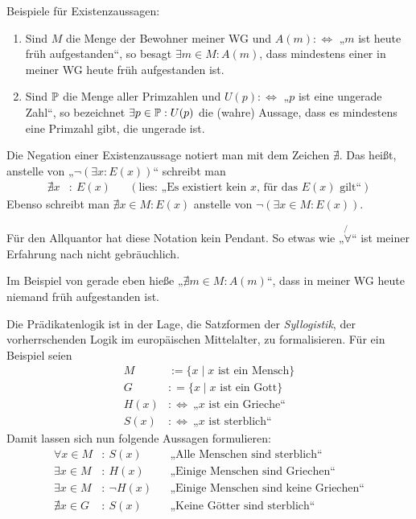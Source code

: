 \begin{bsp}
    Beispiele für Existenzaussagen:
    \begin{enumerate}
        \item Sind $M$ die Menge der Bewohner meiner WG und $A(m):\Leftrightarrow$ „$m$ ist heute früh aufgestanden“, so besagt $\exists m\in M: A(m)$, dass mindestens einer in meiner WG heute früh aufgestanden ist.
        \item Sind $\mathbb P$ die Menge aller Primzahlen und $U(p):\Leftrightarrow$ „$p$ ist eine ungerade Zahl“, so bezeichnet $\exists p\in \mathbb P: U(p)$ die (wahre) Aussage, dass es mindestens eine Primzahl gibt, die ungerade ist.
    \end{enumerate}
\end{bsp}


\begin{nota}
    Die Negation einer Existenzaussage notiert man mit dem Zeichen $\nexists$. Das heißt, anstelle von „$\neg (\exists x: E(x))$“ schreibt man
    \begin{align*}
        \nexists x &:\ E(x) && (\text{lies: „Es existiert kein $x$, für das $E(x)$ gilt“})
    \end{align*}
    Ebenso schreibt man $\nexists x\in M: E(x)$ anstelle von $\neg (\exists x\in M: E(x))$.
    
    Für den Allquantor hat diese Notation kein Pendant. So etwas wie „$\not{\!\forall}$“ ist meiner Erfahrung nach nicht gebräuchlich.
\end{nota}


\begin{bsp}
    Im Beispiel von gerade eben hieße „$\nexists m\in M: A(m)$“, dass in meiner WG heute niemand früh aufgestanden ist.
\end{bsp}


\begin{bsp}[Syllogistik]
    Die Prädikatenlogik ist in der Lage, die Satzformen der \emph{Syllogistik}, der vorherrschenden Logik im europäischen Mittelalter, zu formalisieren. Für ein Beispiel seien
    \begin{align*}
        M & := \{ x\mid  \text{$x$ ist ein Mensch} \} \\
        G &  : = \{x\mid \text{$x$ ist ein Gott} \} \\
        H(x) & :\Leftrightarrow\ \text{„$x$ ist ein Grieche“} \\
        S(x) & :\Leftrightarrow\ \text{„$x$ ist sterblich“}
    \end{align*}
    Damit lassen sich nun folgende Aussagen formulieren:
    \begin{align*}
        \forall x\in M& :\ S(x) && \text{„Alle Menschen sind sterblich“} \\
        \exists x \in M & :\ H(x)&& \text{„Einige Menschen sind Griechen“} \\
        \exists x \in M& :\ \neg H(x) && \text{„Einige Menschen sind keine Griechen“} \\
        \nexists x\in G & :\ S(x)&& \text{„Keine Götter sind sterblich“}
    \end{align*}
\end{bsp}


